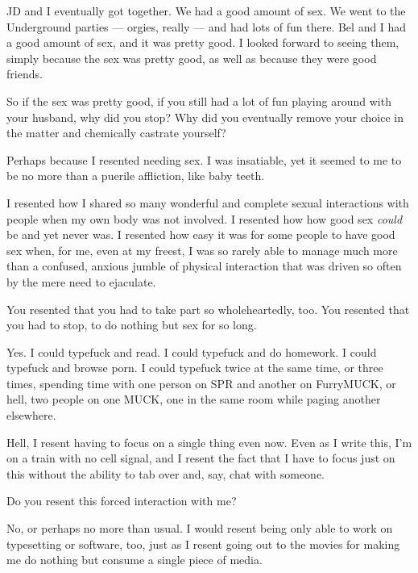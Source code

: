 \begin{paracol}{2}
\begin{leftcolumn}
JD and I eventually got together. We had a good amount of sex. We went to the Underground parties --- orgies, really --- and had lots of fun there. Bel and I had a good amount of sex, and it was pretty good. I looked forward to seeing them, simply because the sex was pretty good, as well as because they were good friends.

\begin{ally}
So if the sex was pretty good, if you still had a lot of fun playing around with your husband, why did you stop? Why did you eventually remove your choice in the matter and chemically castrate yourself?
\end{ally}
Perhaps because I resented needing sex. I was insatiable, yet it seemed to me to be no more than a puerile affliction, like baby teeth.

I resented how I shared so many wonderful and complete sexual interactions with people when my own body was not involved. I resented how how good sex \emph{could} be and yet never was. I resented how easy it was for some people to have good sex when, for me, even at my freest, I was so rarely able to manage much more than a confused, anxious jumble of physical interaction that was driven so often by the mere need to ejaculate.

\begin{ally}
You resented that you had to take part so wholeheartedly, too. You resented that you had to stop, to do nothing but sex for so long.
\end{ally}
Yes. I could typefuck and read. I could typefuck and do homework. I could typefuck and browse porn. I could typefuck twice at the same time, or three times, spending time with one person on SPR and another on FurryMUCK, or hell, two people on one MUCK, one in the same room while paging another elsewhere.

Hell, I resent having to focus on a single thing even now. Even as I write this, I'm on a train with no cell signal, and I resent the fact that I have to focus just on this without the ability to tab over and, say, chat with someone.

\begin{ally}
Do you resent this forced interaction with me?
\end{ally}
No, or perhaps no more than usual. I would resent being only able to work on typesetting or software, too, just as I resent going out to the movies for making me do nothing but consume a single piece of media.
\newpage


\end{leftcolumn}
\end{paracol}
